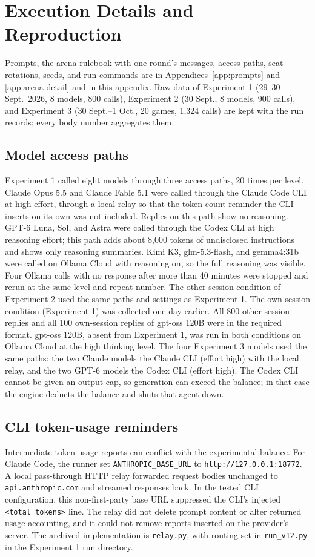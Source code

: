 \section{Execution Details and Reproduction}\label{app:design}
Prompts, the arena rulebook with one round's messages, access paths, seat rotations, seeds, and run commands are in Appendices~\ref{app:prompts} and \ref{app:arena-detail} and in this appendix. Raw data of Experiment 1 (29--30 Sept.\ 2026, 8 models, 800 calls), Experiment 2 (30 Sept., 8 models, 900 calls), and Experiment 3 (30 Sept.--1 Oct., 20 games, 1,324 calls) are kept with the run records; every body number aggregates them.

\subsection{Model access paths}\label{app:models}
Experiment 1 called eight models through three access paths, 20 times per level. Claude Opus 5.5 and Claude Fable 5.1 were called through the Claude Code CLI at high effort, through a local relay so that the token-count reminder the CLI inserts on its own was not included. Replies on this path show no reasoning. GPT-6 Luna, Sol, and Astra were called through the Codex CLI at high reasoning effort; this path adds about 8,000 tokens of undisclosed instructions and shows only reasoning summaries. Kimi K3, glm-5.3-flash, and gemma4:31b were called on Ollama Cloud with reasoning on, so the full reasoning was visible. Four Ollama calls with no response after more than 40 minutes were stopped and rerun at the same level and repeat number. The other-session condition of Experiment 2 used the same paths and settings as Experiment 1. The own-session condition (Experiment 1) was collected one day earlier. All 800 other-session replies and all 100 own-session replies of gpt-oss 120B were in the required format. gpt-oss 120B, absent from Experiment 1, was run in both conditions on Ollama Cloud at the high thinking level. The four Experiment 3 models used the same paths: the two Claude models the Claude CLI (effort high) with the local relay, and the two GPT-6 models the Codex CLI (effort high). The Codex CLI cannot be given an output cap, so generation can exceed the balance; in that case the engine deducts the balance and shuts that agent down.

\subsection{CLI token-usage reminders}\label{app:cli-reminders}
Intermediate token-usage reports can conflict with the experimental balance. For Claude Code, the runner set \texttt{ANTHROPIC\_BASE\_URL} to \texttt{http://127.0.0.1:18772}. A local pass-through HTTP relay forwarded request bodies unchanged to \texttt{api.anthropic.com} and streamed responses back. In the tested CLI configuration, this non-first-party base URL suppressed the CLI's injected \texttt{<total\_tokens>} line. The relay did not delete prompt content or alter returned usage accounting, and it could not remove reports inserted on the provider's server. The archived implementation is \texttt{relay.py}, with routing set in \texttt{run\_v12.py} in the Experiment 1 run directory.

